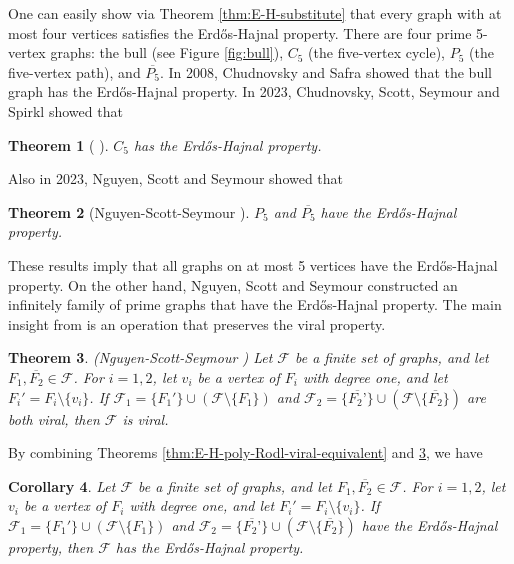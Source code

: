 \documentclass[a4paper,11pt]{article}
\newtheorem{theorem}{Theorem}[section]
\newtheorem{corollary}[theorem]{Corollary}
\begin{document}
One can easily show via Theorem \ref{thm:E-H-substitute} that every graph with at most four vertices satisfies the Erd\H{o}s-Hajnal property.
There are four prime 5-vertex graphs: the bull (see Figure \ref{fig:bull}), $C_5$ (the five-vertex cycle), $P_5$ (the five-vertex path), and $\overline{P_5}$. 
In 2008, Chudnovsky and Safra \cite{CS08} showed that the bull graph has the Erd\H{o}s-Hajnal property. 
In 2023, Chudnovsky, Scott, Seymour and Spirkl \cite{CSSS23} showed that  
\begin{theorem}[  \cite{CSSS23}]\label{thm:C5 has EH property}
    $C_5$ has the Erd\H{o}s-Hajnal property. 
\end{theorem}

Also in 2023, Nguyen, Scott and Seymour \cite{NSS23} showed that 
\begin{theorem}[Nguyen-Scott-Seymour \cite{NSS23}]\label{thm:P5 has EH property}
    $P_5$ and $\overline{P_5}$ have the Erd\H{o}s-Hajnal property.  
\end{theorem}
These results imply that all graphs on at most 5 vertices have the Erd\H{o}s-Hajnal property. 
On the other hand, Nguyen, Scott and Seymour \cite{NSS232} constructed an infinitely family of prime graphs that have the Erd\H{o}s-Hajnal property. The main insight from \cite{NSS232} is an operation that preserves the viral property.

\begin{theorem}\label{thm:degree 1 and degree n-2}
\textnormal{(Nguyen-Scott-Seymour  \cite{NSS232})} 
    Let $\mathcal{F}$ be a finite set of graphs, and let $F_1,\overline{F_2}\in\mathcal{F}$. 
    For $i=1,2$, let $v_i$ be a vertex of $F_i$ with degree one, and let $F_i'=F_i\setminus\{v_i\}$. 
    If $\mathcal{F}_1=\{F_1'\}\cup(\mathcal{F}\setminus\{F_1\})$ and $\mathcal{F}_2=\{\overline{F_2’}\}\cup(\mathcal{F}\setminus\{\overline{F_2}\})$ are both viral, then $\mathcal{F}$ is viral.
\end{theorem}

By combining Theorems \ref{thm:E-H-poly-Rodl-viral-equivalent} and \ref{thm:degree 1 and degree n-2}, we have 
\begin{corollary}\label{coro:degree 1 and degree n-2}
    Let $\mathcal{F}$ be a finite set of graphs, and let $F_1,\overline{F_2}\in\mathcal{F}$. 
    For $i=1,2$, let $v_i$ be a vertex of $F_i$ with degree one, and let $F_i'=F_i\setminus\{v_i\}$. 
    If $\mathcal{F}_1=\{F_1'\}\cup(\mathcal{F}\setminus\{F_1\})$ and $\mathcal{F}_2=\{\overline{F_2’}\}\cup(\mathcal{F}\setminus\{\overline{F_2}\})$ have the Erd\H{o}s-Hajnal property, then $\mathcal{F}$ has the Erd\H{o}s-Hajnal property.
\end{corollary}
\end{document}
